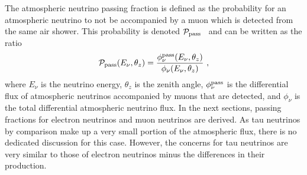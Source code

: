 The atmospheric neutrino passing fraction is defined as the probability for an atmospheric neutrino to not be accompanied by a muon which is detected from the same air shower. This probability is denoted ${\cal P}_{\rm pass}$~\cite{Schonert:2008is, Gaisser:2014bja} and can be written as the ratio
\begin{equation}
{\cal P}_{\rm pass} (E_\nu, \theta_z) = \frac{\phi_\nu^{\rm pass}(E_\nu, \theta_z)}{\phi_\nu(E_\nu, \theta_z)} ~,
\end{equation}
where $E_\nu$ is the neutrino energy, $\theta_z$ is the zenith angle, $\phi_\nu^{\rm pass}$ is the differential flux of atmospheric neutrinos accompanied by muons that are detected, and $\phi_\nu$ is the total differential atmospheric neutrino flux.
In the next sections, passing fractions for electron neutrinos and muon neutrinos are derived.
As tau neutrinos by comparison make up a very small portion of the atmospheric flux, there is no dedicated discussion for this case.
However, the concerns for tau neutrinos are very similar to those of electron neutrinos minus the differences in their production.

